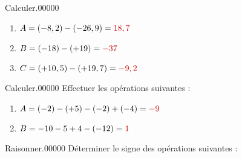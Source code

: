 \documentclass[a4paper,dvipsnames,french,10pt]{book}
\begin{document}
\begin{pageParcoursd}
{\begin{ExoCdN}{Calculer.}{0}{0}{0}{0}{0}
\begin{enumerate}
\item $A=(-8,2)-(-26,9)=\textcolor{red}{18,7}$ \vspace{.2cm}
\item $B=(-18)-(+19)=\textcolor{red}{-37}$ \vspace{.2cm}
\item $C=(+10,5)-(+19,7)=\textcolor{red}{-9,2}$ \vspace{.2cm}
\end{enumerate}
\end{ExoCdN}
}




\begin{ExoCdN}{Calculer.}{0}{0}{0}{0}{0}
Effectuer les opérations suivantes :\vspace{.2cm}
\begin{enumerate}
\item $A=(-2)-(+5)-(-2)+(-4)=\textcolor{red}{-9} $\vspace{.2cm}
\item $B=-10-5+4-(-12)=\textcolor{red}{1} $
\end{enumerate}
\end{ExoCdN}

\begin{ExoCdN}{Raisonner.}{0}{0}{0}{0}{0}
Déterminer le signe des opérations suivantes :\vspace{.2cm}



\end{ExoCdN}
\end{pageParcoursd}
\end{document}

